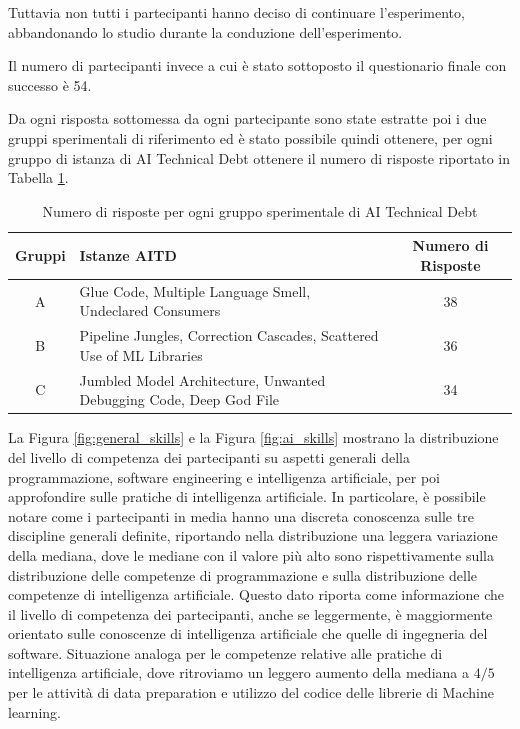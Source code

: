 Tuttavia non tutti i partecipanti hanno deciso di continuare l'esperimento, abbandonando lo studio durante la conduzione dell'esperimento.

Il numero di partecipanti invece a cui è stato sottoposto il questionario finale con successo è 54.

Da ogni risposta sottomessa da ogni partecipante sono state estratte poi i due gruppi sperimentali di riferimento ed è stato possibile quindi ottenere, per ogni gruppo di istanza di AI Technical Debt ottenere il numero di risposte riportato in Tabella \ref{tab:group_exp_results}.


\begin{table}[h]
    \centering
    \begin{tabular}{|c|p{6.5cm}|c|}
    \hline
        \textbf{Gruppi} & \textbf{Istanze AITD} & \textbf{Numero di Risposte}  \\
        \hline
        A &  Glue Code, Multiple Language Smell, Undeclared Consumers & 38 \\
        \hline
        B &  Pipeline Jungles, Correction Cascades, Scattered Use of ML
Libraries & 36 \\
        \hline
        C &  Jumbled Model Architecture, Unwanted Debugging Code,
Deep God File & 34 \\
\hline
    \end{tabular}
    \caption{Numero di risposte per ogni gruppo sperimentale di AI Technical Debt}
    \label{tab:group_exp_results}
\end{table}

La Figura \ref{fig:general_skills} e la Figura \ref{fig:ai_skills} mostrano la distribuzione del livello di competenza dei partecipanti su aspetti generali della programmazione, software engineering e intelligenza artificiale, per poi approfondire sulle pratiche di intelligenza artificiale.
In particolare, è possibile notare come i partecipanti in media hanno una discreta conoscenza sulle tre discipline generali definite, riportando nella distribuzione una leggera variazione della mediana, dove le mediane con il valore più alto sono rispettivamente sulla distribuzione delle competenze di programmazione e sulla distribuzione delle competenze di intelligenza artificiale. Questo dato riporta come informazione che il livello di competenza dei partecipanti, anche se leggermente, è maggiormente orientato sulle conoscenze di intelligenza artificiale che quelle di ingegneria del software.
Situazione analoga per le competenze relative alle pratiche di intelligenza artificiale, dove ritroviamo un leggero aumento della mediana a $4/5$ per le attività di data preparation e utilizzo del codice delle librerie di Machine learning.

